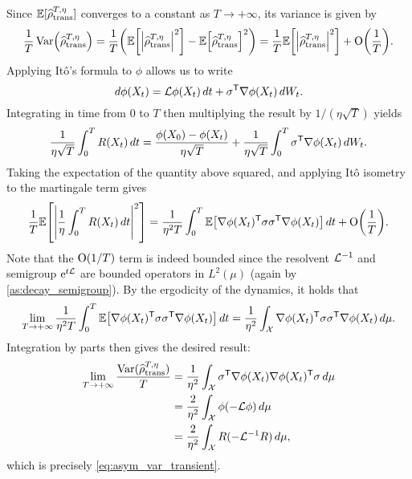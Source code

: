 \begin{appendices}
Since $\mathbb{E}[\widehat{\rho}^{T,\eta}_{\rm trans}]$ converges to a constant as $T\to+\infty$, its variance is given by
%
\begin{align}
	\frac{1}{T}\Var\paren*{\sTest} = \frac{1}{T}\paren*{\E\bkt*{\abs*{\sTest}^2} - \E\bkt*{\sTest}^2} = \frac{1}{T}\E\bkt*{\abs*{\sTest}^2} + \bigO\paren*{\frac{1}{T}}.
\end{align}
%
Applying It\^o's formula to $\phi$ allows us to write
%
\begin{equation}
	d\phi(X_t) = \mathcal{L}\phi(X_t) \, dt + \sigma^\mathsf T \nabla \phi(X_t) \, dW_t.
\end{equation}
%
Integrating in time from $0$ to $T$ then multiplying the result by $1/(\eta\sqrt{T})$ yields
%
\begin{equation}
	\frac{1}{\eta\sqrt{T}}\int_0^T R(X_t) \, dt = \frac{\phi(X_0) - \phi(X_t)}{\eta\sqrt{T}} + \frac{1}{\eta\sqrt{T}}\int_0^T \sigma^\mathsf T \nabla\phi(X_t) \, dW_t.
\end{equation}
%
Taking the expectation of the quantity above squared, and applying It\^o isometry to the martingale term gives
%
\begin{align}
	\frac{1}{T}\E\bkt*{\abs*{\frac{1}{\eta}\int_0^T R(X_t) \, dt}^2} = \frac{1}{\eta^2T}\int_0^T\E\bkt*{\nabla\phi(X_t)^\t \sigma\sigma^\t\nabla\phi(X_t)} \, dt + \bigO\paren*{\frac{1}{T}}.
\end{align}
%
Note that the $\mathrm{O}(1/T)$ term is indeed bounded since the resolvent $\mathcal{L}^{-1}$ and semigroup $\mathrm{e}^{t\mathcal{L}}$ are bounded operators in $L^2(\mu)$ (again by \cref{as:decay_semigroup}).  By the ergodicity of the dynamics, it holds that
%
\begin{equation}
	\lim_{T\to+\infty}\frac{1}{\eta^2T}\int_0^T\E\bkt*{\nabla\phi(X_t)^\t \sigma\sigma^\t\nabla\phi(X_t)} \, dt = \frac{1}{\eta^2}\int_\mathcal{X}\nabla\phi(X_t)^\t \sigma\sigma^\t\nabla\phi(X_t) \, d\mu.
\end{equation}
%
Integration by parts then gives the desired result:
%
\begin{align}
	\lim_{T\to+\infty} \frac{\operatorname{Var}(\widehat{\rho}^{T,\eta}_{\rm trans})}{T} &= \frac{1}{\eta^2}\int_\mathcal{X}\sigma^\mathsf T \nabla\phi(X_t)\nabla \phi(X_t)^\mathsf T \sigma \, d\mu \\
	&= \frac{2}{\eta^2}\int_\mathcal{X} \phi(-\mathcal{L}\phi) \, d\mu \\
	&= \frac{2}{\eta^2}\int_\mathcal{X} R(-\mathcal{L}^{-1}R) \, d\mu,
\end{align}
%
which is precisely \eqref{eq:asym_var_transient}.


\end{appendices}
